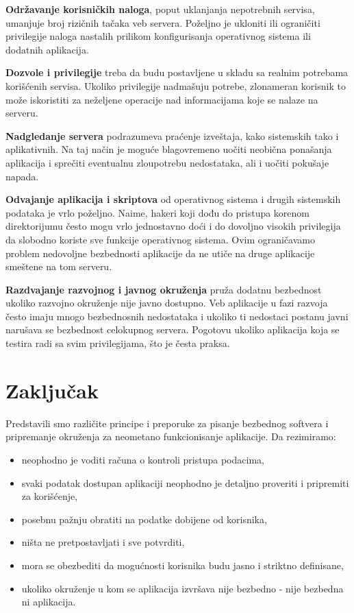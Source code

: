 \documentclass[a4paper]{article}
\begin{document}
\textbf{Održavanje korisničkih naloga}, poput uklanjanja nepotrebnih servisa, umanjuje broj rizičnih tačaka veb servera. Poželjno je ukloniti ili ograničiti privilegije naloga nastalih prilikom konfigurisanja operativnog sistema ili dodatnih aplikacija.

\textbf{Dozvole i privilegije} treba da budu postavljene u skladu sa realnim potrebama korišćenih servisa. Ukoliko privilegije nadmašuju potrebe, zlonameran korisnik to može iskoristiti za neželjene operacije nad informacijama koje se nalaze na serveru.

\textbf{Nadgledanje servera} podrazumeva praćenje izveštaja, kako sistemskih tako i aplikativnih. Na taj način je moguće blagovremeno uočiti neobična ponašanja aplikacija i sprečiti eventualnu zloupotrebu nedostataka, ali i uočiti pokušaje napada.

\textbf{Odvajanje aplikacija i skriptova} od operativnog sistema i drugih sistemskih podataka je vrlo poželjno. Naime, hakeri koji dođu do pristupa korenom direktorijumu često mogu vrlo jednostavno doći i do dovoljno visokih privilegija da slobodno koriste sve funkcije operativnog sistema. Ovim ograničavamo problem nedovoljne bezbednosti aplikacije da ne utiče na druge aplikacije smeštene na tom serveru.

\textbf{Razdvajanje razvojnog i javnog okruženja} pruža dodatnu bezbednost ukoliko razvojno okruženje nije javno dostupno. Veb aplikacije u fazi razvoja često imaju mnogo bezbednosnih nedostataka i ukoliko ti nedostaci postanu javni narušava se bezbednost celokupnog servera. Pogotovu ukoliko aplikacija koja se testira radi sa svim privilegijama, što je česta praksa.

\section{Zaključak}

Predstavili smo različite principe i preporuke za pisanje bezbednog softvera i pripremanje okruženja za neometano funkcionisanje aplikacije. Da rezimiramo:
\begin{itemize}
	\item neophodno je voditi računa o kontroli pristupa podacima,
	\item svaki podatak dostupan aplikaciji neophodno je detaljno proveriti i pripremiti za korišćenje,
	\item posebnu pažnju obratiti na podatke dobijene od korisnika,
	\item ništa ne pretpostavljati i sve potvrditi,
	\item mora se obezbediti da mogućnosti korisnika budu jasno i striktno definisane,
	\item ukoliko okruženje u kom se aplikacija izvršava nije bezbedno - nije bezbedna ni aplikacija.
\end{itemize}
\end{document}
